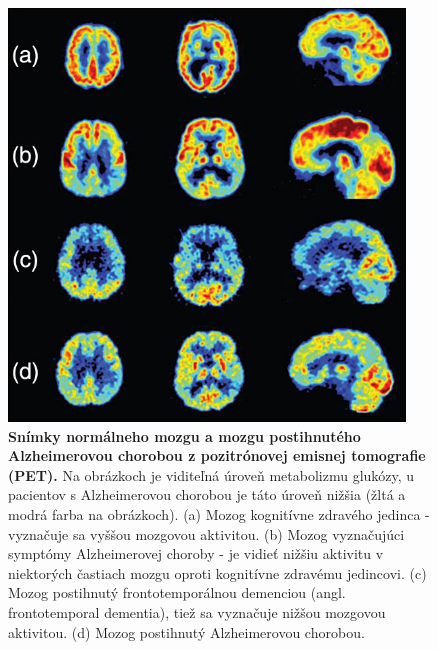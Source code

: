 \begin{figure}[h!]
    \centering
    \includegraphics[scale=0.5]{assets/images/pet.png}
    \caption{\textbf{Snímky normálneho mozgu a mozgu postihnutého Alzheimerovou chorobou z pozitrónovej emisnej tomografie (PET).} \cite{khan2016biomarkers}
    Na obrázkoch je viditeľná úroveň metabolizmu glukózy, u pacientov s Alzheimerovou chorobou je táto úroveň nižšia (žltá a modrá farba na obrázkoch).
    (a) Mozog kognitívne zdravého jedinca - vyznačuje sa vyššou mozgovou aktivitou.
    (b) Mozog vyznačujúci symptómy Alzheimerovej choroby - je vidieť nižšiu aktivitu v niektorých častiach mozgu oproti kognitívne zdravému jedincovi.
    (c) Mozog postihnutý frontotemporálnou demenciou (angl. frontotemporal dementia), tiež sa vyznačuje nižšou mozgovou aktivitou.
    (d) Mozog postihnutý Alzheimerovou chorobou.
    } 
    \label{fig:pet}
\end{figure}



